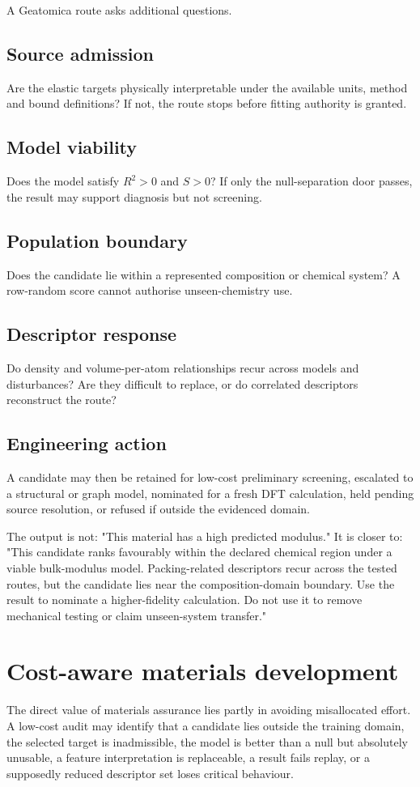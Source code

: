 \documentclass[11pt,a4paper,oneside]{report}
\begin{document}
A Geatomica route asks additional questions.

\subsection{Source admission}
Are the elastic targets physically interpretable under the available units, method and bound definitions? If not, the route stops before fitting authority is granted.

\subsection{Model viability}
Does the model satisfy $R^2>0$ and $S>0$? If only the null-separation door passes, the result may support diagnosis but not screening.

\subsection{Population boundary}
Does the candidate lie within a represented composition or chemical system? A row-random score cannot authorise unseen-chemistry use.

\subsection{Descriptor response}
Do density and volume-per-atom relationships recur across models and disturbances? Are they difficult to replace, or do correlated descriptors reconstruct the route?

\subsection{Engineering action}
A candidate may then be retained for low-cost preliminary screening, escalated to a structural or graph model, nominated for a fresh DFT calculation, held pending source resolution, or refused if outside the evidenced domain.

The output is not: "This material has a high predicted modulus." It is closer to: "This candidate ranks favourably within the declared chemical region under a viable bulk-modulus model. Packing-related descriptors recur across the tested routes, but the candidate lies near the composition-domain boundary. Use the result to nominate a higher-fidelity calculation. Do not use it to remove mechanical testing or claim unseen-system transfer."

\section{Cost-aware materials development}
The direct value of materials assurance lies partly in avoiding misallocated effort. A low-cost audit may identify that a candidate lies outside the training domain, the selected target is inadmissible, the model is better than a null but absolutely unusable, a feature interpretation is replaceable, a result fails replay, or a supposedly reduced descriptor set loses critical behaviour.
\end{document}
